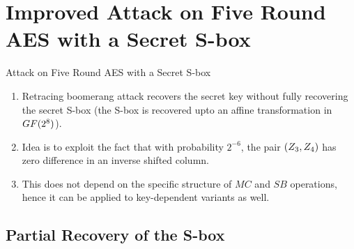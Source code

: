 \documentclass[notheorems]{beamer}
\theoremstyle{definition}
\theoremstyle{example}
\begin{document}
    \section[Secret S-Boxes]{Improved Attack on Five Round AES with a Secret S-box}
    \label{sec:secret-s-box}

    \begin{frame}[<+->]{Attack on Five Round AES with a Secret S-box}
        \begin{enumerate}
            \item Retracing boomerang attack recovers the secret key without
            fully recovering the secret S-box (the S-box is recovered upto an
            affine transformation in \(GF(2^8)\)).
            \item Idea is to exploit the fact that with probability \(2^{-6}\),
            the pair \((Z_3, Z_4)\) has zero difference in an inverse
            shifted column.
            \item This does not depend on the specific structure of \(MC\) and
            \(SB\) operations, hence it can be applied to key-dependent variants
            as well.
        \end{enumerate}
    \end{frame}

    \subsection{Partial Recovery of the S-box}
    \label{subsec:s-box-recovery}
\end{document}
